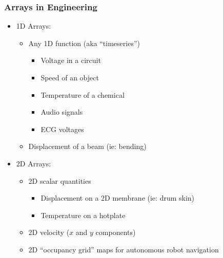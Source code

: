 \documentclass[14pt]{beamer}
\begin{document}
\begin{frame}
\frametitle{Arrays in Engineering}
\begin{itemize}
\item 1D Arrays:
	\begin{itemize}
		\item Any 1D function (aka ``timeseries'')
		\pause
			\begin{itemize}
				\item Voltage in a circuit
				\item Speed of an object
				\item Temperature of a chemical
				\item Audio signals
				\item ECG voltages
			\end{itemize}
		\item Displacement of a beam (ie: bending)
	\end{itemize}
\pause
\item 2D Arrays:
	\begin{itemize}
		\item 2D scalar quantities
		\pause
			\begin{itemize}
				\item Displacement on a 2D membrane (ie: drum skin)
				\item Temperature on a hotplate
			\end{itemize}
		\item 2D velocity ($x$ and $y$ components)
		\item 2D ``occupancy grid'' maps for autonomous robot navigation
	\end{itemize}
\end{itemize}
\end{frame}
\end{document}
